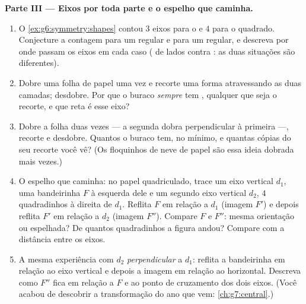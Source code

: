 \begin{problem}
\medskip
\noindent\textbf{Parte III --- Eixos por toda parte e o espelho que
caminha.}
\begin{enumerate}[resume]
  \item O \cref{ex:g6:symmetry:shapes} contou $3$ eixos para o
         e $4$ para o quadrado. Conjecture a
        contagem para um  regular e para um  regular,
        e descreva por onde passam os eixos em cada caso (
        de lados contra : as duas situações são diferentes).
  \item Dobre uma folha de papel uma vez e recorte uma forma
        atravessando as duas camadas; desdobre. Por que o buraco
        \emph{sempre} tem , qualquer que seja o
        recorte, e que reta é esse eixo?
  \item Dobre a folha duas vezes --- a segunda dobra perpendicular à
        primeira ---, recorte e desdobre. Quantos  o
        buraco tem, no mínimo, e quantas cópias do seu recorte você vê?
        (Os floquinhos de neve de papel são essa ideia dobrada mais
        vezes.)
  \item O espelho que caminha: no papel quadriculado, trace um eixo
        vertical $d_1$, uma bandeirinha $F$ à esquerda dele e um
        segundo eixo vertical $d_2$, $4$ quadradinhos à direita de
        $d_1$. Reflita $F$ em relação a $d_1$ (imagem $F'$) e depois
        reflita $F'$ em relação a $d_2$ (imagem $F''$). Compare $F$ e
        $F''$: mesma orientação ou espelhada? De quantos quadradinhos a
        figura andou? Compare com a distância entre os eixos.
  \item A mesma experiência com $d_2$ \emph{perpendicular} a $d_1$:
        reflita a bandeirinha em relação ao eixo vertical e depois a
        imagem em relação ao horizontal. Descreva como $F''$ fica em
        relação a $F$ e ao ponto de cruzamento dos dois eixos. (Você
        acabou de descobrir a transformação do ano que vem:
        \cref{ch:g7:central}.)
\end{enumerate}
\end{problem}
